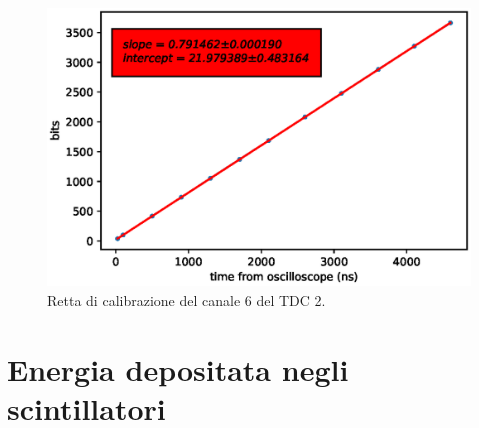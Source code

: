 \begin{figure}[H]
  \centering
  \includegraphics[width=.8\textwidth]{plots/tdc26.eps}
  \caption{Retta di calibrazione del canale 6 del TDC 2.}
  \label{fig:tdc26}
\end{figure}




\chapter{Energia depositata negli scintillatori}             %

